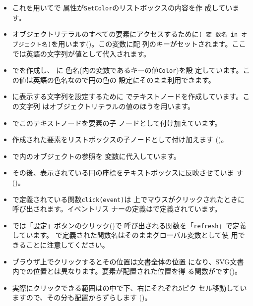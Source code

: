 \begin{itemize}
\iffalse\else
       左側の文字列は、
       \texttt{:}をはさんだ右側はこのキーにおける値であり、こ
       こには任意の\JS のオブジェクトを記述できます。値は「オブジェクト
       名[キー]」の
       形で取り扱うことができます(参照)。
\fi
 \item これを用いてで
       属性が\texttt{SetColor}のリストボックスの内容を作
       成しています。
 \item オブジェクトリテラルのすべての要素にアクセスするために\texttt{( 変
       数名 in オブジェクト名)}を用います()。この変数に配
       列のキーがセットされます。ここでは英語の文字列が値として代入されます。
 \item {}でを作成し、
       に
       色名(内の変数であるキーの値\texttt{Color})を設
       定しています。この値は英語の色名なので円の色の
       設定にそのまま利用できます。
 \item {}に表示する文字列を設定するために
       でテキストノードを作成しています。この文字列
       はオブジェクトリテラルの値のほうを用います。
 \item {}でこのテキストノードを要素の子
       ノードとして付け加えています。
 \item 作成された要素をリストボックスの子ノードとして付け加えます
       ()。
 \item {}で\HTML 内のオブジェクトの参照を
       変数に代入しています。
 \item その後、表示されている円の座標をテキストボックスに反映させていま
       す()。
  \item {}で定義されている関数\texttt{click(event)}は
       \SVG 上でマウスがクリックされたときに呼び出されます。イベントリス
       ナーの定義はで定義されています。
 \item {}では「設定」ボタンのクリック()で
       呼び出される関数を「\texttt{refresh}」で定義しています。
       で定義された関数名はそのままグローバル変数として使
       用できることに注意してください。
 \item ブラウザ上でクリックするとその位置は文書全体の位置
       になり、SVG文書内での位置とは異なります。要素が配置された位置を得
       る関数がです()。
 \item 実際にクリックできる範囲はの中で下、右にそれぞれ$5$ピク
			 セル移動していますので、その分も配置からずらします
			 ()。


\end{itemize}
